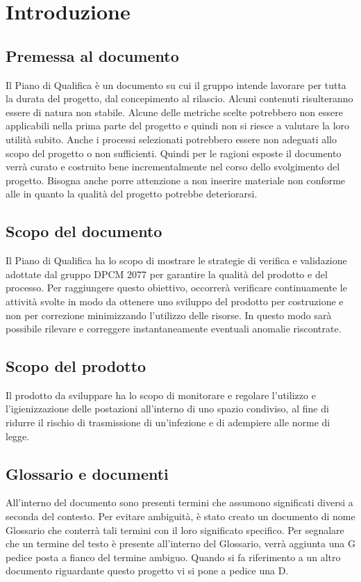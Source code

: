 \section{Introduzione}

\subsection{Premessa al documento}
Il Piano di Qualifica è un documento su cui il gruppo intende lavorare per tutta la durata del progetto, dal concepimento al rilascio.
Alcuni contenuti risulteranno essere di natura non stabile. Alcune delle metriche scelte potrebbero non essere applicabili nella prima parte del progetto e quindi non si riesce a valutare la loro utilità subito.
Anche i processi selezionati potrebbero essere non adeguati allo scopo del progetto o non sufficienti. Quindi per le ragioni esposte il documento verrà curato e costruito bene incrementalmente nel corso 
dello svolgimento del progetto. Bisogna anche porre attenzione a non inserire materiale non conforme alle  in quanto la qualità del progetto potrebbe deteriorarsi.

\subsection{Scopo del documento}
Il Piano di Qualifica ha lo scopo di mostrare le strategie di verifica e validazione adottate dal gruppo DPCM 2077 per garantire la qualità del prodotto e del processo. 
Per raggiungere questo obiettivo, occorrerà verificare continuamente le attività svolte in modo da ottenere uno sviluppo del prodotto per costruzione e non per correzione minimizzando l’utilizzo delle risorse.
In questo modo sarà possibile rilevare e correggere instantaneamente eventuali anomalie riscontrate.

\subsection{Scopo del prodotto}
Il prodotto da sviluppare ha lo scopo di monitorare e regolare l'utilizzo e l'igienizzazione delle postazioni all'interno di uno spazio condiviso, al fine di ridurre il rischio di trasmissione di un'infezione e di adempiere alle norme di legge. 
\subsection{Glossario e documenti} 
All'interno del  documento sono presenti termini che assumono significati diversi a seconda del contesto.
Per evitare ambiguità, è stato creato un  documento di nome Glossario che  conterrà tali termini con il loro significato specifico. Per segnalare che un termine del testo è presente all'interno del Glossario, verrà aggiunta una G pedice posta a fianco del termine ambiguo.
Quando si fa riferimento a un altro documento riguardante questo progetto vi si pone a pedice una D.


